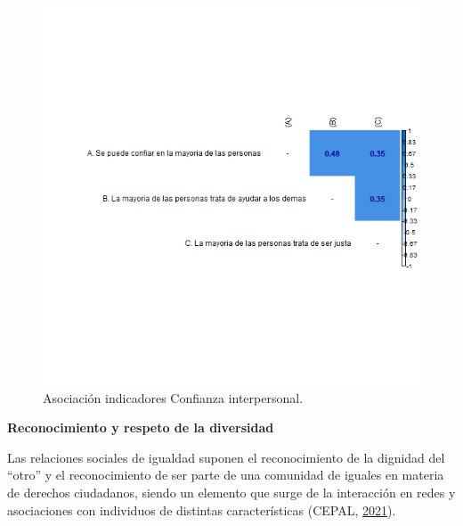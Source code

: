 \documentclass[
  12pt,
]{book}
\begin{document}
\begin{figure}[H]

{\centering \includegraphics[width=1\linewidth,height=1\textheight]{output/graphs/confianza-interpersonal_cor} 

}

\caption{Asociación indicadores Confianza interpersonal.}\label{fig:confianza-interpersonal-cor}
\end{figure}

\textbf{Reconocimiento y respeto de la diversidad}

Las relaciones sociales de igualdad suponen el reconocimiento de la dignidad del ``otro'' y el reconocimiento de ser parte de una comunidad de iguales en materia de derechos ciudadanos, siendo un elemento que surge de la interacción en redes y asociaciones con individuos de distintas características (CEPAL, \protect\hyperlink{ref-cepal_Cohesion_2021}{2021}).
\end{document}
